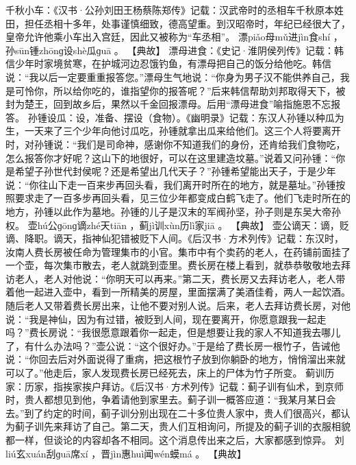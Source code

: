 \documentclass[12pt,UTF8]{ctexbook}
\begin{document}
千秋小车：《汉书·公孙刘田王杨蔡陈郑传》记载：汉武帝时的丞相车千秋原本姓田，担任丞相十多年，处事谨慎细致，德高望重。到汉昭帝时，年纪已经很大了，皇帝允许他乘小车出入宫廷，因此又被称为“车丞相”。
漂piǎo母mǔ进jìn食shí
，孙sūn锺zhōnɡ设shè瓜ɡuā
。
【典故】
漂母进食：《史记·淮阴侯列传》记载：韩信少年时家境贫寒，在护城河边忍饿钓鱼，有漂母把自己的饭分给他吃。韩信说：“我以后一定要重重报答您。”漂母生气地说：“你身为男子汉不能供养自己，我是可怜你，所以给你吃的，谁指望你的报答呢？”后来韩信帮助刘邦取得天下，被封为楚王，回到故乡后，果然以千金回报漂母。后用“漂母进食”喻指施恩不忘报答。
孙锺设瓜：设，准备、摆设（食物）。《幽明录》记载：东汉人孙锺以种瓜为生，一天来了三个少年向他讨瓜吃，孙锺就拿出瓜来给他们。这三个人将要离开时，对孙锺说：“我们是司命神，感谢你不知道我们的身份，还肯给我们食物吃，怎么报答你才好呢？这山下的地很好，可以在这里建造坟墓。”说着又问孙锺：“你是希望子孙世代封侯呢？还是希望出几代天子？”孙锺希望能出天子，于是少年说：“你往山下走一百来步再回头看，我们离开时所在的地方，就是墓址。”孙锺按照要求走了一百多步再回头看，见三位少年都变成白鹤飞走了。他们飞走时所在的地方，孙锺以此作为墓地。孙锺的儿子是汉末的军阀孙坚，孙子则是东吴大帝孙权。
壶hú公ɡōnɡ谪zhé天tiān
，蓟jì训xùn历lì家jiā
。
【典故】
壶公谪天：谪，贬谪、降职。谪天，指神仙犯错被贬下人间。《后汉书·方术列传》记载：东汉时，汝南人费长房被任命为管理集市的小官。集市中有个卖药的老人，在药铺前面挂了一个壶，每次集市散去，老人就跳到壶里。费长房在楼上看到，就恭恭敬敬地去拜访老人，老人对他说：“你明天可以再来。”第二天，费长房又去拜访老人，老人带着他一起进入壶中，看到一所精美的房屋，里面摆满了美酒佳肴，两人一起饮酒。随后老人又带着费长房出来，让他不要对别人说。后来，老人去拜访费长房，对他说：“我是神仙，因为有过错，被贬到人间，现在要离开，你愿意跟我一起走吗？”费长房说：“我很愿意跟着你一起走，但是想要让我的家人不知道我去哪儿了，有什么办法吗？”壶公说：“这个很好办。”于是给了费长房一根竹子，告诫他说：“你回去后对外面说得了重病，把这根竹子放到你躺卧的地方，悄悄溜出来就可以了。”他走后，家人发现费长房已经死去，床上的尸体为竹子所变。
蓟训历家：历家，指挨家挨户拜访。《后汉书·方术列传》记载：蓟子训有仙术，到京师时，贵人都想见到他，争着请他到家里去。蓟子训一概答应道：“我某月某日会去。”到了约定的时间，蓟子训分别出现在二十多位贵人家中，贵人们很高兴，都认为蓟子训先来拜访了自己。第二天，贵人们互相询问，所提及的蓟子训的衣服相貌都一样，但谈论的内容却各不相同。这个消息传出来之后，大家都感到惊异。
刘liú玄xuán刮ɡuā席xí
，晋jìn惠huì闻wén蟆má
。
【典故】
\end{document}
